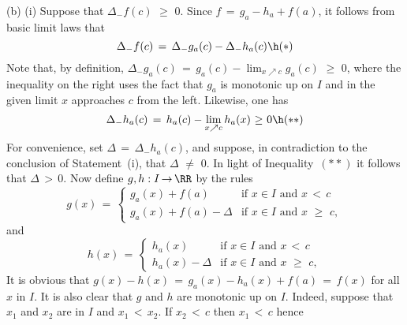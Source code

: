         (b) (i) Suppose that ${\Delta}_{-} f(c)\,\,{\geq}\,\,0$. Since $f \,=\, g_{a}-h_{a}+f(a)$, it follows from basic limit laws that
        \begin{displaymath}
        {\Delta}_{-} f(c) \,=\, {\Delta}_{-} g_{a}(c) - {\Delta}_{-} h_{a}(c) \h ({\ast})
        \end{displaymath}
    Note that, by definition,
        ${\Delta}_{-} g_{a}(c) \,=\, g_{a}(c)-\lim_{x{\nearrow}c} g_{a}(c)\,\,{\geq}\,\,0$,
    where the inequality on the right uses the fact that $g_{a}$ is monotonic up on $I$ and in the given limit $x$ approaches $c$ from the left.
    Likewise, one has
        \begin{displaymath}
        {\Delta}_{-} h_{a}(c) \,=\, h_{a}(c) - \lim_{x{\nearrow}c} h_{a}(x)\,\,{\geq}\,\,0 \h ({\ast}{\ast})
        \end{displaymath}
    For convenience, set ${\Delta} \,=\, {\Delta}_{-} h_{a}(c)$, and suppose, in contradiction to the conclusion of Statement~(i), that ${\Delta} \,\,{\neq}\,\, 0$.
    In light of Inequality~$({\ast}{\ast})$ it follows that ${\Delta}\,>\,0$.
    Now define $g,h:I \,{\rightarrow}\, {\RR}$ by the rules
        \begin{displaymath}
        g(x) \,=\, \left\{
        \begin{array}{ll}
        g_{a}(x) + f(a) & \mbox{if $x{\in}I$ and $x\,<\,c$} \\
        g_{a}(x) + f(a) - {\Delta} & \mbox{if $x{\in}I$ and $x\,\,{\geq}\,\,c$},
        \end{array}
                                \right.
        \end{displaymath}
    and
        \begin{displaymath}
        h(x) \,=\, \left\{
        \begin{array}{ll}
        h_{a}(x) & \mbox{if $x{\in}I$ and $x\,<\,c$} \\
        h_{a}(x) - {\Delta} & \mbox{if $x{\in}I$ and $x\,\,{\geq}\,\,c$},
        \end{array}
                                \right.
        \end{displaymath}
    It is obvious that $g(x)-h(x) \,=\, g_{a}(x)-h_{a}(x)+f(a) \,=\, f(x)$ for all $x$ in $I$.
    It is also clear that $g$ and $h$ are monotonic up on $I$. Indeed, suppose that $x_{1}$ and $x_{2}$ are in $I$ and $x_{1}\,<\,x_{2}$.
    If $x_{2}\,<\,c$ then $x_{1}\,<\,c$ hence
